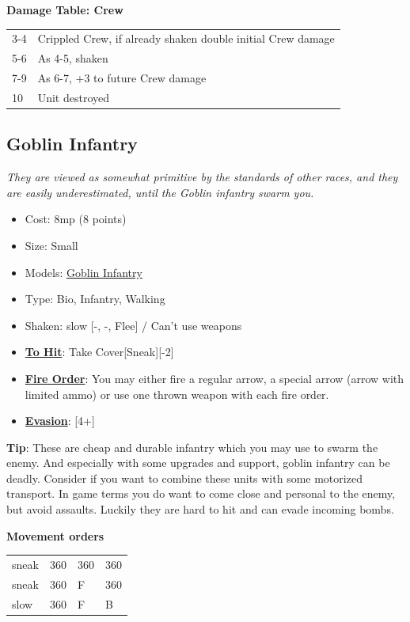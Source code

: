\documentclass[a4paper,12pt]{article}
\begin{document}
\noindent\textbf{Damage Table: Crew}

\begin{tabular}{@{}lp{}@{}}
3-4 & Crippled Crew, if already shaken double initial Crew damage \\
5-6 & As 4-5, shaken \\
7-9 & As 6-7, +3 to future Crew damage \\
10 & Unit destroyed \\
\end{tabular}
\vspace{1ex}
\subsection{Goblin Infantry}
\label{unit-goblin-infantry}

\textit{They are viewed as somewhat primitive by the standards of other races, and they are easily underestimated, until the Goblin infantry swarm you.}

\begin{itemize}
\item Cost: 8mp (8 points)
\item Size: Small
\item Models: \hyperref[model-goblin-infantry]{Goblin Infantry}
\item Type: Bio, Infantry, Walking
\item Shaken: slow [-, -, Flee] / Can't use weapons
\item \textbf{\hyperref[rule-special-to-hit]{To Hit}}: Take Cover[Sneak][-2]
\item \textbf{\hyperref[rule-special-fire-order]{Fire Order}}: You may either fire a regular arrow, a special arrow (arrow with limited ammo) or use one thrown weapon with each fire order.
\item \textbf{\hyperref[rule-special-evasion]{Evasion}}: [4+]

\end{itemize}
\noindent\textbf{Tip}: These are cheap and durable infantry which you may use to swarm the enemy. And especially with some upgrades and support, goblin infantry can be deadly. Consider if you want to combine these units with some motorized transport. In game terms you do want to come close and personal to the enemy, but avoid assaults. Luckily they are hard to hit and can evade incoming bombs.

\noindent\textbf{Movement orders}

\begin{tabular}{llll}
sneak & 360\textdegree{} & 360\textdegree{} & 360\textdegree{} \\
sneak & 360\textdegree{} & F & 360\textdegree{} \\
slow & 360\textdegree{} & F & B \\
\end{tabular}
\vspace{1ex}
\end{document}
